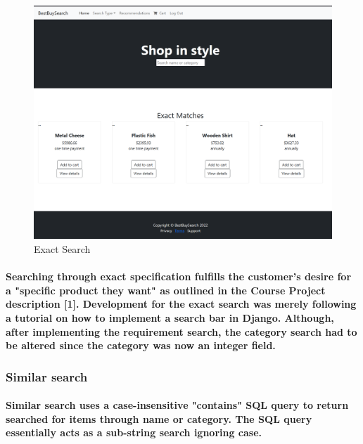 \documentclass[sigconf]{acmart}
\begin{document}
\begin{figure}[H]
    \centering
    \includegraphics[scale=0.2]{ProductsExact.PNG}
    \caption{Exact Search}
    \label{fig:my_label}
\end{figure}

\paragraph{Searching through exact specification fulfills the customer's desire for a "specific product they want" as outlined in the Course Project description [1]. Development for the exact search was merely following a tutorial on how to implement a search bar in Django. Although, after implementing the requirement search, the category search had to be altered since the category was now an integer field. }

\subsubsection{Similar search}

\paragraph{ Similar search uses a case-insensitive "contains" SQL query to return searched for items through name or category. The SQL query essentially acts as a sub-string search ignoring case. } 
\end{document}
